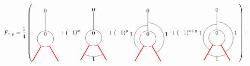 	\begin{equation}
		P_{x,y}=\frac{1}{4}\left(
			\begin{tikzpicture}[scale=1,baseline=(current bounding box.center)]
			\draw (0,0) circle (0.5cm);
			\draw[red,line width=0.4mm]
			\foreach \a in {-60, -120} {
				(\a:0.5) -- (\a:1.6)
			};
			\draw[] (90:0.5) -- (90:1.6);
			\node at (90:.3cm){$0$};\node at (90:1.75cm){$0$};
			\end{tikzpicture}
			+(-1)^x
			\begin{tikzpicture}[scale=1,baseline=(current bounding box.center)]
			\draw (0,0) circle (0.5cm);
			\draw[red,line width=0.4mm]
			\foreach \a in {-60, -120} {
				(\a:0.5) -- (\a:1.6)
			};
			\draw ([shift=(-120:1.15cm)]0,0) arc (-120:-60:1.15cm);
			\draw[] (90:0.5) -- (90:1.6);
			\node at (90:.3cm){$0$};\node at (90:1.75cm){$0$};
						\node at (0,-1.3) {$1$};
			\end{tikzpicture}
			+(-1)^y
			\begin{tikzpicture}[scale=1,baseline=(current bounding box.center)]
			\draw (0,0) circle (0.5cm);
			\draw[red,line width=0.4mm]
			\foreach \a in {-60, -120} {
				(\a:0.5) -- (\a:1.6)
			};
									\draw ([shift=(-60:1cm)]0,0) arc (-60:90:1cm);
									\draw ([shift=(240:0.85cm)]0,0) arc (240:90:0.85cm);
			\draw[] (90:0.5) -- (90:1.6);
			\node at (90:.3cm){$0$};\node at (90:1.75cm){$0$};
						\node at (-1,0.3) {$1$};
									\node at (1.15,0.3) {$1$};
			\end{tikzpicture}
			+(-1)^{x+y}
			\begin{tikzpicture}[scale=1,baseline=(current bounding box.center)]
			\draw (0,0) circle (0.5cm);
			\draw[red,line width=0.4mm]
			\foreach \a in {-60, -120} {
				(\a:0.5) -- (\a:1.6)
			};
									\draw ([shift=(-60:1cm)]0,0) arc (-60:90:1cm);
			\draw ([shift=(-120:1.15cm)]0,0) arc (-120:-60:1.15cm);
									\draw ([shift=(240:0.85cm)]0,0) arc (240:90:0.85cm);
			\draw[] (90:0.5) -- (90:1.6);
			\node at (90:.3cm){$0$};\node at (90:1.75cm){$0$};
			\node at (-1,0.3) {$1$};
			\node at (1.15,0.3) {$1$};
			\node at (0,-1.3) {$1$};
			\end{tikzpicture}
			\right).
	\end{equation}
	

